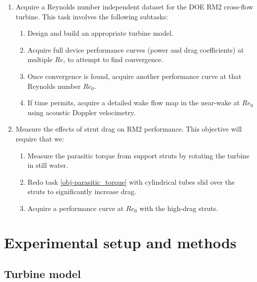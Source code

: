 \documentclass[14pt,letterpaper]{scrreprt}
\begin{document}
\begin{enumerate}

	\item Acquire a Reynolds number independent dataset for the DOE RM2 cross-flow
	turbine. This task involves the following subtasks:

		\begin{enumerate}
			\item Design and build an appropriate turbine model.
		
			\item Acquire full device performance curves (power and drag coefficients) at
			multiple $Re$, to attempt to find convergence.
		  
			\item Once convergence is found, acquire another performance curve at that
			Reynolds number $Re_0$.
		
			\item If time permits, acquire a detailed wake flow map in the near-wake at
			$Re_0$ using acoustic Doppler velocimetry.
		\end{enumerate}
	
	\item Measure the effects of strut drag on RM2 performance. This objective will
	require that we:
	
	\begin{enumerate}
		\item Measure the parasitic torque from support struts by rotating the turbine
		in still water. \label{obj-parasitic_torque}
		
		\item Redo task \ref{obj-parasitic_torque} with cylindrical tubes slid over
		the struts to significantly increase drag.
		
		\item Acquire a performance curve at $Re_0$ with the high-drag struts. 
	\end{enumerate}
	
\end{enumerate}


\chapter{Experimental setup and methods}

\section{Turbine model}
\end{document}
